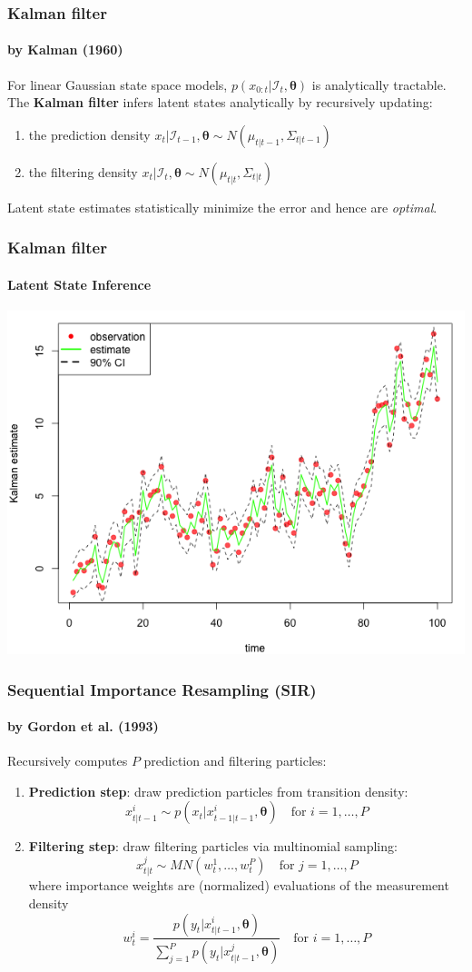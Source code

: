 \documentclass[11pt]{beamer}
\begin{document}
\begin{frame}
\frametitle{Kalman filter}
\framesubtitle{by Kalman (1960)}
For linear Gaussian state space models, $p(x_{0:t} | \mathcal{I}_t,\boldsymbol{\theta})$ is analytically tractable. The \textbf{Kalman filter} infers latent states analytically by recursively updating:
\begin{enumerate}
\item the prediction density $x_{t} | \mathcal{I}_{t-1}, \boldsymbol{\theta} \sim N(\mu_{t | t-1}, \Sigma_{t | t-1})$
\item the filtering density $x_{t} | \mathcal{I}_{t}, \boldsymbol{\theta} \sim N(\mu_{t | t}, \Sigma_{t | t})$
\end{enumerate}
\bigskip
Latent state estimates statistically minimize the error and hence are \textit{optimal}.
\end{frame}

\begin{frame}
\frametitle{Kalman filter}
\framesubtitle{Latent State Inference}
\centering
\includegraphics[scale=0.45]{ullm-estimate-kalman}
\end{frame}

\begin{frame}
\frametitle{Sequential Importance Resampling (SIR)}
\framesubtitle{by Gordon et al. (1993)}
Recursively computes $P$ prediction and filtering particles:
\begin{enumerate}
	\item \textbf{Prediction step}: draw prediction particles from transition density:
	$$
	x_{t | t-1}^i \sim p(x_t | x_{t-1 | t-1}^i, \boldsymbol{\theta}) \quad \text{for } i=1, \ldots, P
	$$
	\item \textbf{Filtering step}: draw filtering particles via multinomial sampling: 	
	$$
	x_{t | t }^j \sim MN(w_t^1, \ldots, w_t^P) \quad \text{for } j=1, \ldots, P
	$$
	where importance weights are (normalized) evaluations of the measurement density 
	$$
	w_{t}^i = \frac{p(y_t | x_{t | t-1}^i, \boldsymbol{\theta})}{\sum_{j=1}^P p(y_t | x_{t | t-1}^j, \boldsymbol{\theta})} \quad \text{for } i=1, \ldots, P
	$$
\end{enumerate}
\end{frame}
\end{document}
